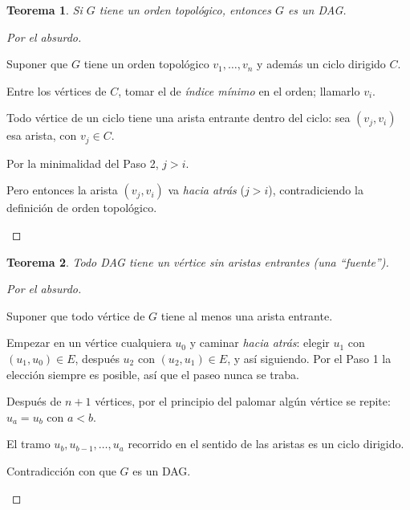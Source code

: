 \documentclass[11pt,a4paper]{article}
\theoremstyle{plain}
\newtheorem{teorema}{Teorema}[section]
\theoremstyle{definition}
\theoremstyle{remark}
\begin{document}
\begin{teorema}
Si $G$ tiene un orden topológico, entonces $G$ es un DAG.
\end{teorema}
\begin{proof}[Por el absurdo]
\begin{pasos}
\item Suponer que $G$ tiene un orden topológico $v_1,\dots,v_n$ y además un ciclo
dirigido $C$.
\item Entre los vértices de $C$, tomar el de \emph{índice mínimo} en el orden; llamarlo
$v_i$.
\item Todo vértice de un ciclo tiene una arista entrante dentro del ciclo: sea
$(v_j,v_i)$ esa arista, con $v_j\in C$.
\item Por la minimalidad del Paso 2, $j>i$.
\item Pero entonces la arista $(v_j,v_i)$ va \emph{hacia atrás} ($j>i$), contradiciendo
la definición de orden topológico. \qedhere
\end{pasos}
\end{proof}

\begin{teorema}
Todo DAG tiene un vértice sin aristas entrantes (una ``fuente'').
\end{teorema}
\begin{proof}[Por el absurdo]
\begin{pasos}
\item Suponer que todo vértice de $G$ tiene al menos una arista entrante.
\item Empezar en un vértice cualquiera $u_0$ y caminar \emph{hacia atrás}: elegir
$u_1$ con $(u_1,u_0)\in E$, después $u_2$ con $(u_2,u_1)\in E$, y así siguiendo. Por el
Paso 1 la elección siempre es posible, así que el paseo nunca se traba.
\item Después de $n+1$ vértices, por el principio del palomar algún vértice se repite:
$u_a=u_b$ con $a<b$.
\item El tramo $u_b,u_{b-1},\dots,u_a$ recorrido en el sentido de las aristas es un
ciclo dirigido.
\item Contradicción con que $G$ es un DAG. \qedhere
\end{pasos}
\end{proof}
\end{document}
